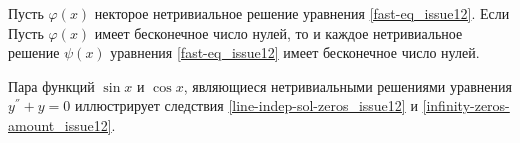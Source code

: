 \begin{corollary}\label{infinity-zeros-amount_issue12}
    Пусть $\varphi(x)$ некторое нетривиальное решение уравнения \eqref{fast-eq_issue12}. Если Пусть $\varphi(x)$
    имеет бесконечное число нулей, то и каждое нетривиальное решение $\psi(x)$ уравнения \eqref{fast-eq_issue12} имеет бесконечное число нулей.
\end{corollary}

\begin{example}
    Пара функций $\sin x$ и $\cos x$, являющиеся нетривиальными решениями уравнения $y^{''} + y = 0$ 
    иллюстрирует следствия \ref{line-indep-sol-zeros_issue12} и \ref{infinity-zeros-amount_issue12}. 
\end{example}
